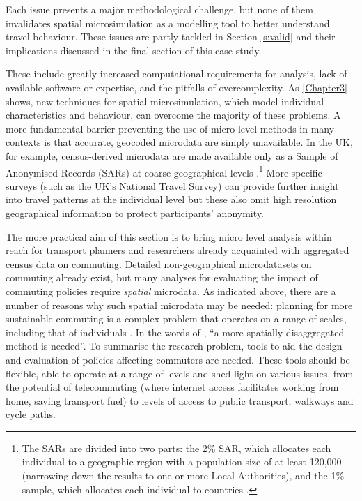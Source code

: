 \documentclass[a4paper, 11pt, twoside]{Thesis}
\begin{document}
Each issue presents a major methodological challenge, but none
of them invalidates spatial microsimulation as a modelling tool to
better understand travel behaviour. These issues are partly tackled in
Section \ref{s:valid} and their implications discussed in the final section of
this case study.

These include greatly increased computational requirements for
analysis, lack of available software or expertise, and the pitfalls of
overcomplexity. As \cref{Chapter3} shows, new techniques for spatial
microsimulation, which model individual characteristics and behaviour,
can overcome the majority of these problems.
A more fundamental barrier preventing the use of micro level
methods in many contexts is that accurate, geocoded
microdata are simply unavailable. In the UK, for example, census-derived
microdata are made available only as a Sample of Anonymised Records (SARs) at
coarse geographical levels
\citep{Dale2002}.\footnote{The
SARs are divided into two parts: the 2\% SAR, which
allocates each individual to a geographic region with a population
size of at least 120,000 (narrowing-down the results to one or more Local
Authorities), and the 1\% sample, which allocates each individual
to countries \citep{Dale2002}.
}
More specific surveys (such as the UK's National Travel Survey) can provide
further insight into travel patterns at the
individual level but these also omit high resolution geographical
information to protect participants' anonymity.


The more practical aim of this section is to bring micro level analysis
within reach for transport planners and
researchers already acquainted with aggregated census data on commuting.
Detailed non-geographical microdatasets on commuting already exist,
but many analyses for evaluating the
impact of commuting policies require \emph{spatial} microdata. As indicated
above, there are a number of  reasons why such spatial microdata may be
needed: planning for more sustainable commuting is a complex problem that
operates on a range of scales, including that of individuals
\citep{Vega2012, Verhetsel2010}. In the words of \citet[p.~313]{Li2012}, ``a more spatially
disaggregated method is needed''. To summarise the research problem,
tools to aid the design and evaluation of policies affecting commuters are needed.
These tools should be flexible, able to operate at a range of
levels and shed light on various issues, from the potential of telecommuting
(where internet access facilitates working from home, saving transport fuel)
to levels of access to public transport, walkways and cycle paths.
\end{document}
